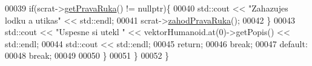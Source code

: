 \begin{DoxyCode}
00039                     \textcolor{keywordflow}{if}(scrat->\hyperlink{classIceAge_1_1ObleceneVybaveniVeverky_a0ca3d404578b0099b97fc7910d5e718a}{getPravaRuka}() != \textcolor{keyword}{nullptr})\{
00040                         std::cout << \textcolor{stringliteral}{"Zahazujes lodku a utikas"} << std::endl;
00041                         scrat->\hyperlink{classIceAge_1_1ObleceneVybaveniVeverky_ac24580a8bfcf97220c1967f58111c8f1}{zahodPravaRuka}();
00042                     \}
00043                     std::cout << \textcolor{stringliteral}{"Uspesne si utekl "} << vektorHumanoid.at(0)->getPopis() << std::endl;
00044                     std::cout << std::endl;
00045                     \textcolor{keywordflow}{return};
00046                     \textcolor{keywordflow}{break};
00047                 \textcolor{keywordflow}{default}:
00048                     \textcolor{keywordflow}{break};
00049 
00050             \}
00051         \}
00052 \}
\end{DoxyCode}
